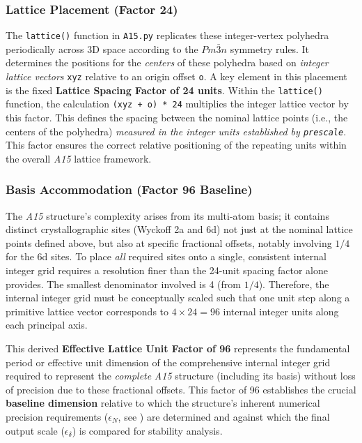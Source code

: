 \documentclass[10pt]{article}
\def\AAAB{\textit{A15}}
\begin{document}
\subsubsection{Lattice Placement (Factor 24)}\label{subsubsec-scaling-lattice}
The \texttt{lattice()} function in \texttt{A15.py} replicates these integer-vertex polyhedra periodically across 3D space according to the $Pm\bar{3}n$ symmetry rules. It determines the positions for the \emph{centers} of these polyhedra based on \emph{integer lattice vectors} \texttt{xyz} relative to an origin offset \texttt{o}. A key element in this placement is the fixed \textbf{Lattice Spacing Factor of 24 units}. Within the \texttt{lattice()} function, the calculation \texttt{(xyz + o) * 24} multiplies the integer lattice vector by this factor. This defines the spacing between the nominal lattice points (i.e., the centers of the polyhedra) \emph{measured in the integer units established by \texttt{prescale}}. This factor ensures the correct relative positioning of the repeating units within the overall \AAAB{} lattice framework.

\subsubsection{Basis Accommodation (Factor 96 Baseline)}\label{subsubsec-scaling-baseline}
The \AAAB{} structure's complexity arises from its multi-atom basis; it contains distinct crystallographic sites (Wyckoff 2a and 6d) not just at the nominal lattice points defined above, but also at specific fractional offsets, notably involving $1/4$ for the 6d sites. To place \emph{all} required sites onto a single, consistent internal integer grid requires a resolution finer than the 24-unit spacing factor alone provides. The smallest denominator involved is 4 (from $1/4$). Therefore, the internal integer grid must be conceptually scaled such that one unit step along a primitive lattice vector corresponds to $4 \times 24 = 96$ internal integer units along each principal axis.

This derived \textbf{Effective Lattice Unit Factor of 96} represents the fundamental period or effective unit dimension of the comprehensive internal integer grid required to represent the \emph{complete} \AAAB{} structure (including its basis) without loss of precision due to these fractional offsets. This factor of 96 establishes the crucial \textbf{baseline dimension} relative to which the structure's inherent numerical precision requirements ($\epsilon_N$, see ) are determined and against which the final output scale ($\epsilon_\delta$) is compared for stability analysis.
\end{document}
